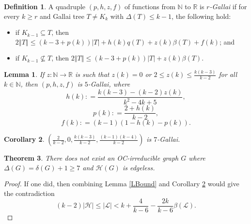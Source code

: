 \documentclass[12pt]{article}
\theoremstyle{plain}
\newtheorem{thm}{Theorem}
\newtheorem{lem}[thm]{Lemma}
\newtheorem{cor}[thm]{Corollary}
\theoremstyle{definition}
\newtheorem{defn}{Definition}
\theoremstyle{remark}
\newcommand{\fancy}[1]{\mathcal{#1}}
\newcommand{\IN}{\mathbb{N}}
\newcommand{\IR}{\mathbb{R}}
\renewcommand{\L}{\fancy{L}}
\newcommand{\HH}{\fancy{H}}
\newcommand{\card}[1]{\left|#1\right|}
\newcommand{\size}[1]{\left\Vert#1\right\Vert}
\newcommand{\func}[3]{#1\colon #2 \rightarrow #3}
\newcommand{\parens}[1]{\left( #1 \right)}
\newcommand{\DefinedAs}{\mathrel{\mathop:}=}
\begin{document}
\begin{defn}
A quadruple $\parens{p,h,z,f}$ of functions from $\IN$ to $\IR$ is \emph{$r$-Gallai} if for every $k \ge r$ and Gallai tree $T \ne K_k$ with $\Delta(T) \le k-1$,
the following hold:
\begin{itemize}
\item if $K_{k-1} \subseteq T$, then $2\size{T} \le \parens{k-3 + p(k)}\card{T} + h(k)q(T) + z(k)\beta(T) + f(k)$; and
\item if $K_{k-1} \not\subseteq T$, then $2\size{T} \le \parens{k-3 + p(k)}\card{T} + z(k)\beta(T)$.
\end{itemize}
\end{defn}

\begin{lem}
If $\func{z}{\IN}{\IR}$ is such that $z(k) = 0$ or $2 \le z(k) \le \frac{k(k-3)}{k-2}$  for all $k \in \IN$, then 
$(p,h,z,f)$ is $5$-Gallai, where
\[h(k) \DefinedAs \frac{k(k-3) - (k-2)z(k)}{k^2-4k+5},\]
\[p(k) \DefinedAs \frac{2 + h(k)}{k-2},\]
\[f(k) \DefinedAs (k-1)(1 - h(k) - p(k)).\]
\end{lem}

\begin{cor}\label{GBound}
$\parens{\frac{2}{k-2}, 0, \frac{k(k-3)}{k-2}, \frac{(k-1)(k-4)}{k-2}}$ is $7$-Gallai.
\end{cor}

\begin{thm}\label{LBoundT}
There does not exist an OC-irreducible graph $G$ where $\Delta(G) = \delta(G) + 1 \ge 7$ and $\HH(G)$ is edgeless.
\end{thm}
\begin{proof}
If one did, then combining Lemma \ref{LBound} and Corollary \ref{GBound} would give the contradiction
\[(k-2)\card{\HH} \le \card{\L} < k + \frac{4}{k-6} - \frac{2k}{k-6}\beta(\L).\]
\end{proof}
\end{document}
